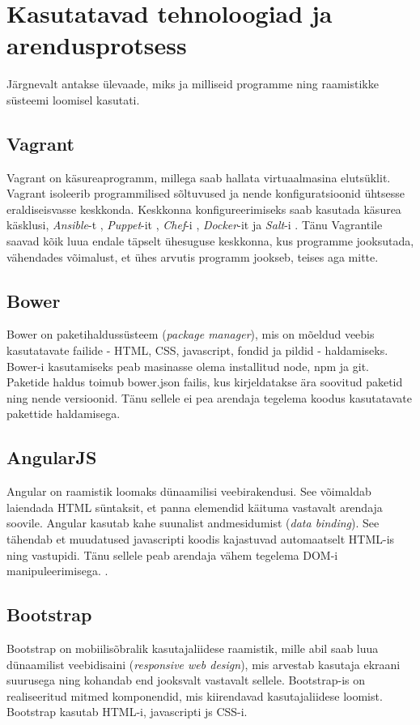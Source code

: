 \documentclass[a4paper,12pt]{article} %
\begin{document}
\section{Kasutatavad tehnoloogiad ja arendusprotsess}
Järgnevalt antakse ülevaade, miks ja milliseid programme ning raamistikke süsteemi loomisel kasutati.
\subsection{Vagrant}
Vagrant on käsureaprogramm, millega saab hallata virtuaalmasina elutsüklit. Vagrant isoleerib programmilised sõltuvused ja nende konfiguratsioonid ühtsesse eraldiseisvasse keskkonda. Keskkonna konfigureerimiseks saab kasutada käsurea käsklusi, \textit{Ansible}-t \cite{Ansible}, \textit{Puppet}-it \cite{Puppet}, \textit{Chef}-i \cite{Chef}, \textit{Docker}-it \cite{Docker} ja \textit{Salt}-i \cite{Salt}. Tänu Vagrantile saavad kõik luua endale täpselt ühesuguse keskkonna, kus programme jooksutada, vähendades võimalust, et ühes arvutis programm jookseb, teises aga mitte. \cite{Why_Vagrant}
\subsection{Bower}
Bower on paketihaldussüsteem (\textit{package manager}), mis on mõeldud veebis kasutatavate failide - HTML, CSS, javascript, fondid ja pildid - haldamiseks. Bower-i kasutamiseks peab masinasse olema installitud node, npm ja git. Paketide haldus toimub bower.json failis, kus kirjeldatakse ära soovitud paketid ning nende versioonid. Tänu sellele ei pea arendaja tegelema koodus kasutatavate pakettide haldamisega. \cite{Bower}
\subsection{AngularJS}
Angular on raamistik loomaks dünaamilisi veebirakendusi. See võimaldab laiendada HTML süntaksit, et panna elemendid käituma vastavalt arendaja soovile. Angular kasutab kahe suunalist andmesidumist (\textit{data binding}). See tähendab et muudatused javascripti koodis kajastuvad automaatselt HTML-is ning vastupidi. Tänu sellele peab arendaja vähem tegelema DOM-i manipuleerimisega.  \cite{AngularJS}.
\subsection{Bootstrap}
Bootstrap on mobiilisõbralik kasutajaliidese raamistik, mille abil saab luua dünaamilist veebidisaini (\textit{responsive web design}), mis arvestab kasutaja ekraani suurusega ning kohandab end jooksvalt vastavalt sellele. Bootstrap-is on realiseeritud mitmed komponendid, mis kiirendavad kasutajaliidese loomist. Bootstrap kasutab HTML-i, javascripti js CSS-i. \cite{Bootstrap}
\end{document}
